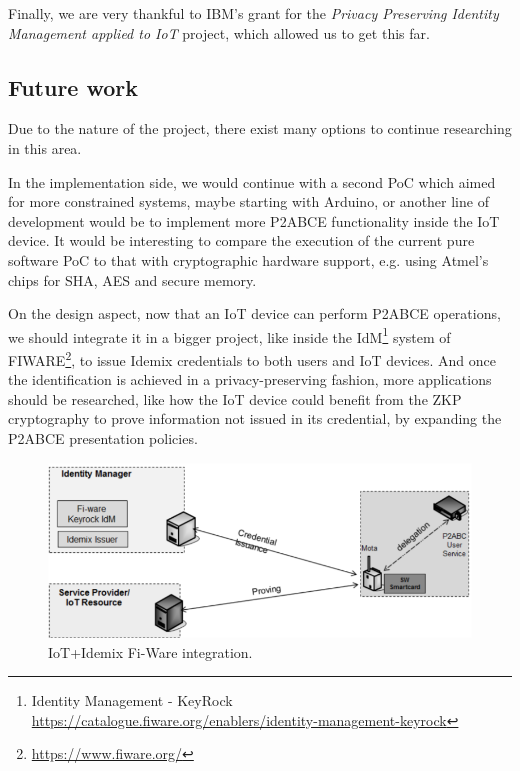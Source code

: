 \documentclass[journal]{IEEEtran}
\begin{document}
Finally, we are very thankful to IBM's grant for the \textit{Privacy Preserving Identity Management applied to IoT} project, which allowed us to get this far. 


\subsection{Future work}


Due to the nature of the project, there exist many options to continue researching in this area.

In the implementation side, we would continue with a second PoC which aimed for more constrained systems, maybe starting with Arduino, or another line of development would be to implement more P2ABCE functionality inside the IoT device. It would be interesting to compare the execution of the current pure software PoC to that with cryptographic hardware support, e.g. using Atmel's chips for SHA, AES and secure memory.

On the design aspect, now that an IoT device can perform P2ABCE operations, we should integrate it in a bigger project, like inside the IdM\footnote{Identity Management - KeyRock \url{https://catalogue.fiware.org/enablers/identity-management-keyrock}} system of FIWARE\footnote{\url{https://www.fiware.org/}}, to issue Idemix credentials to both users and IoT devices. And once the identification is achieved in a privacy-preserving fashion, more applications should be researched, like how the IoT device could benefit from the ZKP cryptography to prove information not issued in its credential, by expanding the P2ABCE presentation policies.

\begin{figure}[bth]
	\begin{center}
		\includegraphics[width=\linewidth]{gfx/fiware}
		\caption{IoT+Idemix Fi-Ware integration.}
	\end{center}
	\label{fig:fiware}
\end{figure}
\end{document}
